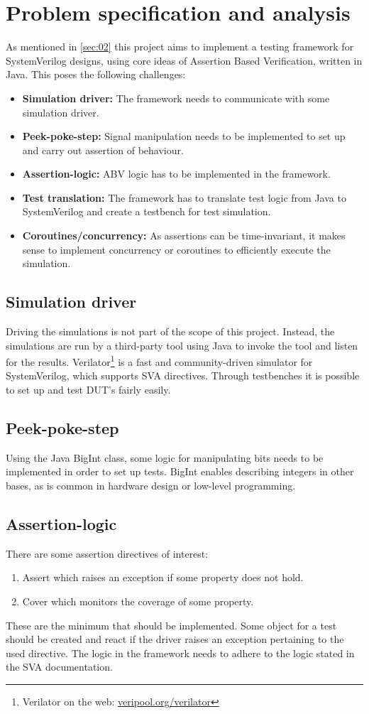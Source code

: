\section{Problem specification and analysis}\label{sec:04}
As mentioned in \cref{sec:02} this project aims to implement a testing framework for SystemVerilog designs, using core ideas of Assertion Based Verification, written in Java. This poses the following challenges:
\begin{itemize}
    \item \textbf{Simulation driver:} The framework needs to communicate with some simulation driver.
    \item \textbf{Peek-poke-step:} Signal manipulation needs to be implemented to set up and carry out assertion of behaviour.
    \item \textbf{Assertion-logic: } ABV logic has to be implemented in the framework.
    \item \textbf{Test translation:} The framework has to translate test logic from Java to SystemVerilog and create a testbench for test simulation.
    \item \textbf{Coroutines/concurrency:} As assertions can be time-invariant, it makes sense to implement concurrency or coroutines to efficiently execute the simulation.
\end{itemize}
\subsection{Simulation driver}
Driving the simulations is not part of the scope of this project. Instead, the simulations are run by a third-party tool using Java to invoke the tool and listen for the results. Verilator\footnote{Verilator on the web: \href{https://www.veripool.org/verilator/}{veripool.org/verilator}} is a fast and community-driven simulator for SystemVerilog, which supports SVA directives. Through testbenches it is possible to set up and test DUT's fairly easily.
\subsection{Peek-poke-step}
Using the Java BigInt class, some logic for manipulating bits needs to be implemented in order to set up tests. BigInt enables describing integers in other bases, as is common in hardware design or low-level programming.
\subsection{Assertion-logic}
There are some assertion directives of interest:
\begin{enumerate}
    \item Assert which raises an exception if some property does not hold.
    \item Cover which monitors the coverage of some property.
\end{enumerate}
These are the minimum that should be implemented. Some object for a test should be created and react if the driver raises an exception pertaining to the used directive.
The logic in the framework needs to adhere to the logic stated in the SVA documentation.
